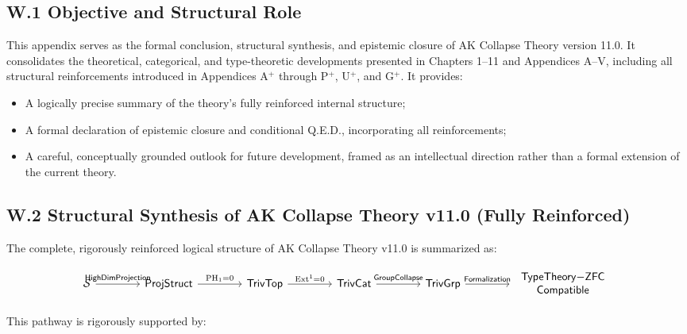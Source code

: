 \documentclass[11pt]{article}
\begin{document}
\subsection*{W.1 Objective and Structural Role}

This appendix serves as the formal conclusion, structural synthesis, and epistemic closure of AK Collapse Theory version 11.0.  
It consolidates the theoretical, categorical, and type-theoretic developments presented in Chapters 1–11 and Appendices A–V, including all structural reinforcements introduced in Appendices A$^{+}$ through P$^{+}$, U$^{+}$, and G$^{+}$.  
It provides:

\begin{itemize}
    \item A logically precise summary of the theory's fully reinforced internal structure;
    \item A formal declaration of epistemic closure and conditional Q.E.D., incorporating all reinforcements;
    \item A careful, conceptually grounded outlook for future development, framed as an intellectual direction rather than a formal extension of the current theory.
\end{itemize}

\subsection*{W.2 Structural Synthesis of AK Collapse Theory v11.0 (Fully Reinforced)}

The complete, rigorously reinforced logical structure of AK Collapse Theory v11.0 is summarized as:

\[
\begin{tikzcd}[column sep=4em, row sep=3em]
\mathcal{S} \arrow[r, "\mathsf{HighDimProjection}"]
& \mathsf{ProjStruct} \arrow[r, "\mathrm{PH}_1 = 0"]
& \mathsf{TrivTop} \arrow[r, "\mathrm{Ext}^1 = 0"]
& \mathsf{TrivCat} \arrow[r, "\mathsf{GroupCollapse}"]
& \mathsf{TrivGrp} \arrow[r, "\mathsf{Formalization}"]
& {\begin{tabular}{c}
\(\mathsf{TypeTheory{-}ZFC}\) \\
\(\mathsf{Compatible}\)
\end{tabular}}
\end{tikzcd}
\]

This pathway is rigorously supported by:
\end{document}
